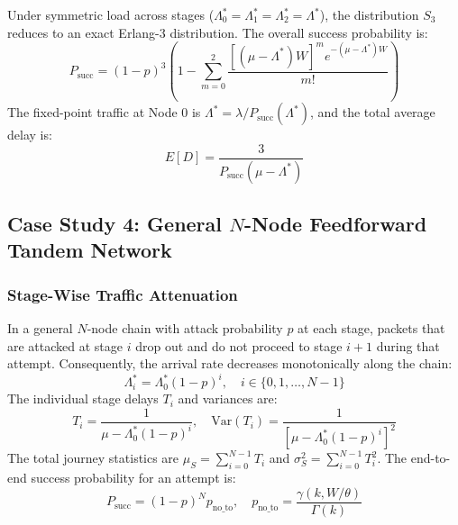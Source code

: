 \documentclass[journal,compsoc]{IEEEtran}
\begin{document}
Under symmetric load across stages ($\Lambda_0^* = \Lambda_1^* = \Lambda_2^* = \Lambda^*$), the distribution $S_3$ reduces to an exact Erlang-3 distribution. The overall success probability is:
\begin{equation}
P_{\text{succ}} = (1 - p)^3 \left(1 - \sum_{m=0}^2 \frac{[(\mu - \Lambda^*)W]^m e^{-(\mu - \Lambda^*)W}}{m!}\right)
\end{equation}
The fixed-point traffic at Node 0 is $\Lambda^* = \lambda / P_{\text{succ}}(\Lambda^*)$, and the total average delay is:
\begin{equation}
E[D] = \frac{3}{P_{\text{succ}}(\mu - \Lambda^*)}
\end{equation}

\subsection{Case Study 4: General \texorpdfstring{$N$}{N}-Node Feedforward Tandem Network}
\subsubsection{Stage-Wise Traffic Attenuation}
In a general $N$-node chain with attack probability $p$ at each stage, packets that are attacked at stage $i$ drop out and do not proceed to stage $i+1$ during that attempt. Consequently, the arrival rate decreases monotonically along the chain:
\begin{equation}
\Lambda_i^* = \Lambda_0^* (1 - p)^i, \quad i \in \{0, 1, \dots, N-1\}
\label{eq:tandem_attenuation}
\end{equation}
The individual stage delays $T_i$ and variances are:
\begin{equation}
T_i = \frac{1}{\mu - \Lambda_0^*(1 - p)^i}, \quad \text{Var}(T_i) = \frac{1}{[\mu - \Lambda_0^*(1 - p)^i]^2}
\end{equation}
The total journey statistics are $\mu_S = \sum_{i=0}^{N-1} T_i$ and $\sigma_S^2 = \sum_{i=0}^{N-1} T_i^2$. The end-to-end success probability for an attempt is:
\begin{equation}
P_{\text{succ}} = (1 - p)^N p_{\text{no\_to}}, \quad p_{\text{no\_to}} = \frac{\gamma(k, W/\theta)}{\Gamma(k)}
\end{equation}
\end{document}
